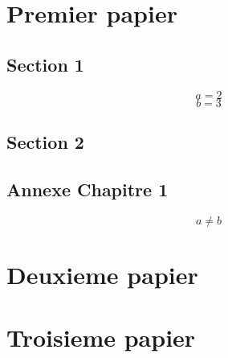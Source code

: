 \documentclass{book}
\begin{document}
\tableofcontents
        \chapter{Premier papier}
        \section{Section 1}
        \lipsum[1]
        \begin{equation}
        a=2
        \end{equation}
        \begin{equation}
        b=3
        \end{equation}
        \section{Section 2}
        \lipsum[2-3]
        
        \clearpage
        \begin{subappendices}
		\section*{Annexe Chapitre 1} 
		

 \lipsum[1]
		\begin{equation}
		a\neq b
		\end{equation}
		\lipsum[2]
        \end{subappendices}
        \chapter{Deuxieme papier}
        \chapter{Troisieme papier}
\end{document}
